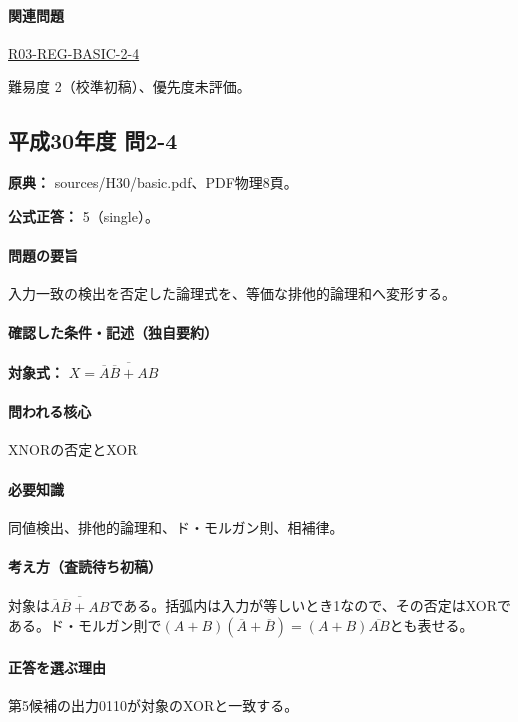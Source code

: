 \paragraph{関連問題} \hyperref[q:r03-reg-basic-2-4]{R03-REG-BASIC-2-4}

\par 難易度 2（校準初稿）、優先度未評価。

\subsection{平成30年度 問2-4}
\label{q:h30-reg-basic-2-4}

\noindent\textbf{原典：} sources/H30/basic.pdf、PDF物理8頁。

\textbf{公式正答：} 5（single）。

\paragraph{問題の要旨} 入力一致の検出を否定した論理式を、等価な排他的論理和へ変形する。

\paragraph{確認した条件・記述（独自要約）}\mbox{}\par

\noindent\textbf{対象式：} \(X=\overline{\overline A\overline B+AB}\)\par

\paragraph{問われる核心} XNORの否定とXOR

\paragraph{必要知識} 同値検出、排他的論理和、ド・モルガン則、相補律。

\paragraph{考え方（査読待ち初稿）} 対象は\(\overline{\overline A\overline B+AB}\)である。括弧内は入力が等しいとき1なので、その否定はXORである。ド・モルガン則で\((A+B)(\overline A+\overline B)=(A+B)\overline{AB}\)とも表せる。

\paragraph{正答を選ぶ理由} 第5候補の出力0110が対象のXORと一致する。

